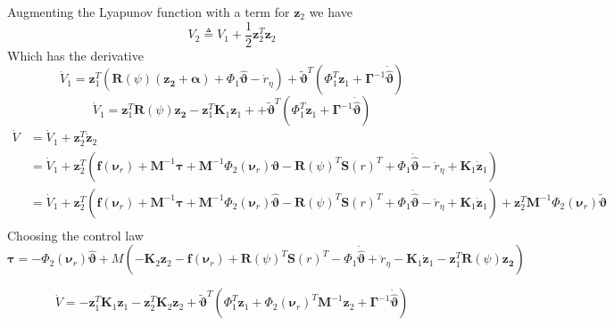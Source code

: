 \documentclass[12pt,a4]{article}
\begin{document}
Augmenting the Lyapunov function with a term for $\bm{z}_2$ we have
\begin{equation}
	V_2 \triangleq V_1 + \frac{1}{2}\bm{z}_2^T\bm{z}_2
\end{equation}
Which has the derivative
\begin{equation}
	\dot{V}_1 = \bm{z}_1^T\left( \bm{R}(\psi)(\bm{z_2} + \bm{\alpha})+ \Phi_1\bm{\hat{\vartheta}} - \dot{r}_{\eta} \right)
	+ \bm{\tilde{\vartheta}}^T \left(  \Phi_1^T\bm{z}_1 + \bm{\Gamma}^{-1}\bm{\dot{\hat{\vartheta}}} \right)
\end{equation}
\begin{equation}
	\dot{V}_1 = \bm{z}_1^T \bm{R}(\psi) \bm{z_2} - \bm{z}_1^T \bm{K}_1 \bm{z}_1 +
	+ \bm{\tilde{\vartheta}}^T \left(  \Phi_1^T\bm{z}_1 + \bm{\Gamma}^{-1}\bm{\dot{\hat{\vartheta}}} \right)
\end{equation}
\begin{align}
	\dot{V} & = \dot{V}_1 + \bm{z}_2^T\dot{\bm{z}}_2                                                                                           \\
	        & = \dot{V}_1 + \bm{z}_2^T \left(  \bm{f}(\bm{\nu}_r) + \bm{M}^{-1}\bm{\tau} + \bm{M}^{-1}\Phi_2 (\bm{\nu}_r )\bm{\vartheta}
	-\bm{R}(\psi)^T \bm{S}(r)^T + \Phi_1 \bm{\dot{\hat{\vartheta}}} - \ddot{r}_{\eta} + \bm{K}_1 \bm{\dot{z}}_1  \right)                       \\
	        & = \dot{V}_1 + \bm{z}_2^T \left(  \bm{f}(\bm{\nu}_r) + \bm{M}^{-1}\bm{\tau} + \bm{M}^{-1}\Phi_2 (\bm{\nu}_r )\bm{\hat{\vartheta}}
	-\bm{R}(\psi)^T \bm{S}(r)^T + \Phi_1 \bm{\dot{\hat{\vartheta}}} - \ddot{r}_{\eta} + \bm{K}_1 \bm{\dot{z}}_1  \right)     +
	\bm{z}_2^T \bm{M}^{-1}\Phi_2 (\bm{\nu}_r )\bm{\tilde{\vartheta}}
	\\
\end{align}
Choosing the control law
\begin{equation}
	\bm{\tau} = -\Phi_2 (\bm{\nu}_r )\bm{\hat{\vartheta}} + M \left( - \bm{K}_2 \bm{z}_2 -\bm{f}(\bm{\nu}_r) +\bm{R}(\psi)^T \bm{S}(r)^T - \Phi_1 \bm{\dot{\hat{\vartheta}}}
	+ \ddot{r}_{\eta} - \bm{K}_1 \bm{\dot{z}}_1    -\bm{z}_1^T \bm{R}(\psi) \bm{z_2}   \right)
\end{equation}

\begin{equation}
	\dot{V} =  - \bm{z}_1^T \bm{K}_1 \bm{z}_1 -  \bm{z}_2^T \bm{K}_2 \bm{z}_2 + \bm{\tilde{\vartheta}}^T \left(  \Phi_1^T\bm{z}_1 +  \Phi_2 (\bm{\nu}_r )^T\bm{M}^{-1}\bm{z}_2 + \bm{\Gamma}^{-1}\bm{\dot{\hat{\vartheta}}} \right)
\end{equation}
\end{document}
